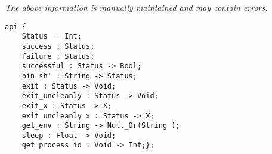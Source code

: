 \label{api:Winix\_Process\_\_Premicrothread}

{\tiny \it The above information is manually maintained and may contain errors.}
\begin{verbatim}
api {
    Status  = Int;
    success : Status;
    failure : Status;
    successful : Status -> Bool;
    bin_sh' : String -> Status;
    exit : Status -> Void;
    exit_uncleanly : Status -> Void;
    exit_x : Status -> X;
    exit_uncleanly_x : Status -> X;
    get_env : String -> Null_Or(String );
    sleep : Float -> Void;
    get_process_id : Void -> Int;};
\end{verbatim}
